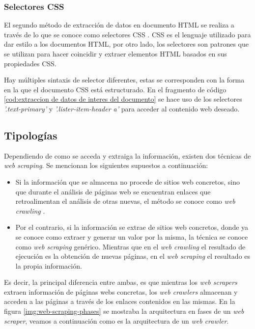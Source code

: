 \subsubsection{Selectores CSS}
\label{subsubsec:selectores CSS}

El segundo método de extracción de datos en documento HTML se realiza a través de lo que se conoce como
selectores CSS \cite{css-xpath-lilland}. CSS es el lenguaje utilizado para dar estilo a los documentos
HTML, por otro lado, los selectores son patrones que se utilizan para hacer coincidir y extraer elementos
HTML basados en sus propiedades CSS.

Hay múltiples sintaxis de selector diferentes, estas se corresponden con la forma en la que el documento
CSS está estructurado. En el fragmento de código \ref{cod:extraccion de datos de interes del documento}
se hace uso de los selectores \emph{'.text-primary'} y \emph{'.lister-item-header a'} para acceder al
contenido web deseado.

\subsection{Tipologías}
\label{subsec:tipologias}
Dependiendo de como se acceda y extraiga la información, existen dos técnicas de \emph{web scraping}. Se 
mencionan los siguientes supuestos a continuación:

\begin{itemize}
\item Si la información que se almacena no procede de sitios web concretos, sino que durante el análisis
de páginas web se encuentran enlaces que retroalimentan el análisis de otras nuevas, el método se conoce
como \emph{web crawling} \cite{Andreas-Mehlfuhrer}.

\item Por el contrario, si la información se extrae de sitios web concretos, donde ya se conoce como extraer 
y generar un valor por la misma, la técnica se conoce como \emph{web scraping} genérico. Mientras que en 
el \emph{web crawling} el resultado de ejecución es la obtención de nuevas páginas, en el \emph{web scraping} 
el resultado es la propia información.
\end{itemize}

Es decir, la principal diferencia entre ambas, es que mientras los \emph{web scrapers} extraen información 
de páginas webs concretas, los \emph{web crawlers} almacenan y acceden a las páginas a través de los enlaces
contenidos en las mismas. En la figura \ref{img:web-scraping-phases} se mostraba la arquitectura en fases
de un \emph{web scraper}, veamos a continuación como es la arquitectura de un \emph{web crawler}.

